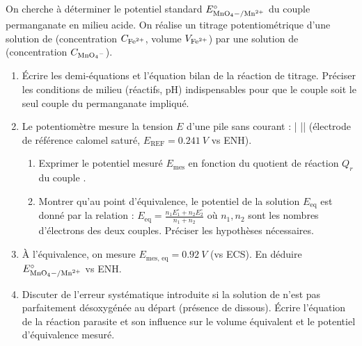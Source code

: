 \documentclass[11pt]{article}
\begin{document}
\begin{exercice}
On cherche à déterminer le potentiel standard $E^{\circ}_{\ce{MnO4-/Mn^{2+}}}$ du couple permanganate en milieu acide. On réalise un titrage potentiométrique d'une solution de  (concentration $C_{\ce{Fe^{2+}}}$, volume $V_{\ce{Fe^{2+}}}$) par une solution de  (concentration $C_{\ce{MnO4-}}$).
\begin{enumerate}
    \item Écrire les demi-équations et l'équation bilan de la réaction de titrage. Préciser les conditions de milieu (réactifs, pH) indispensables pour que le couple  soit le seul couple du permanganate impliqué.
    \item Le potentiomètre mesure la tension $E$ d'une pile sans courant :  |  ||  (électrode de référence calomel saturé, $E_{\text{REF}} = \SI{+0,241}{V}$ vs ENH).
    \begin{enumerate}
        \item Exprimer le potentiel mesuré $E_{\text{mes}}$ en fonction du quotient de réaction $Q_r$ du couple .
        \item Montrer qu'au point d'équivalence, le potentiel de la solution $E_{\text{eq}}$ est donné par la relation : $E_{\text{eq}} = \frac{n_1 E^{\circ}_1 + n_2 E^{\circ}_2}{n_1 + n_2}$ où $n_1, n_2$ sont les nombres d'électrons des deux couples. Préciser les hypothèses nécessaires.
    \end{enumerate}
    \item À l'équivalence, on mesure $E_{\text{mes, eq}} = \SI{0,92}{V}$ (vs ECS). En déduire $E^{\circ}_{\ce{MnO4-/Mn^{2+}}}$ vs ENH.
    \item Discuter de l'erreur systématique introduite si la solution de  n'est pas parfaitement désoxygénée au départ (présence de  dissous). Écrire l'équation de la réaction parasite et son influence sur le volume équivalent et le potentiel d'équivalence mesuré.
\end{enumerate}
\end{exercice}
\end{document}
